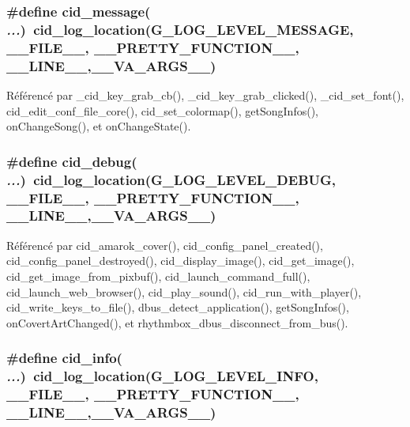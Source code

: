 \subsubsection{\setlength{\rightskip}{0pt plus 5cm}\#define cid\_\-message( {\em ...})~cid\_\-log\_\-location(G\_\-LOG\_\-LEVEL\_\-MESSAGE, \_\-\_\-FILE\_\-\_\-, \_\-\_\-PRETTY\_\-FUNCTION\_\-\_\-, \_\-\_\-LINE\_\-\_\-,\_\-\_\-VA\_\-ARGS\_\-\_\-)}\label{cid-messages_8h_917db8a5ab32e34db2b51b8ea2d40ba3}




Référencé par \_\-cid\_\-key\_\-grab\_\-cb(), \_\-cid\_\-key\_\-grab\_\-clicked(), \_\-cid\_\-set\_\-font(), cid\_\-edit\_\-conf\_\-file\_\-core(), cid\_\-set\_\-colormap(), getSongInfos(), onChangeSong(), et onChangeState().
\subsubsection{\setlength{\rightskip}{0pt plus 5cm}\#define cid\_\-debug( {\em ...})~cid\_\-log\_\-location(G\_\-LOG\_\-LEVEL\_\-DEBUG, \_\-\_\-FILE\_\-\_\-, \_\-\_\-PRETTY\_\-FUNCTION\_\-\_\-, \_\-\_\-LINE\_\-\_\-,\_\-\_\-VA\_\-ARGS\_\-\_\-)}\label{cid-messages_8h_143958f39ebfcdb9e75ad6a0bc18b31a}




Référencé par cid\_\-amarok\_\-cover(), cid\_\-config\_\-panel\_\-created(), cid\_\-config\_\-panel\_\-destroyed(), cid\_\-display\_\-image(), cid\_\-get\_\-image(), cid\_\-get\_\-image\_\-from\_\-pixbuf(), cid\_\-launch\_\-command\_\-full(), cid\_\-launch\_\-web\_\-browser(), cid\_\-play\_\-sound(), cid\_\-run\_\-with\_\-player(), cid\_\-write\_\-keys\_\-to\_\-file(), dbus\_\-detect\_\-application(), getSongInfos(), onCovertArtChanged(), et rhythmbox\_\-dbus\_\-disconnect\_\-from\_\-bus().
\subsubsection{\setlength{\rightskip}{0pt plus 5cm}\#define cid\_\-info( {\em ...})~cid\_\-log\_\-location(G\_\-LOG\_\-LEVEL\_\-INFO, \_\-\_\-FILE\_\-\_\-, \_\-\_\-PRETTY\_\-FUNCTION\_\-\_\-, \_\-\_\-LINE\_\-\_\-,\_\-\_\-VA\_\-ARGS\_\-\_\-)}\label{cid-messages_8h_2193112c7e8e04bc2cdf8dcd77dee902}




